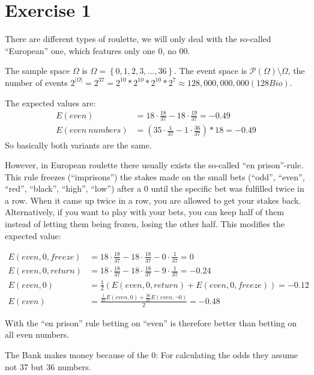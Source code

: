 \def \TutorialSheetNumber{2}


\section*{Exercise 1}
There are different types of roulette, we will only deal with the so-called 
``European'' one, which features only one $0$, no $00$.

The sample space $\Omega$ is $\Omega=\left\{0, 1, 2, 3, ..., 36\right\}$. The event space is $\mathcal{P} \left( \Omega \right) \setminus \Omega$, the number of events $2^{|\Omega|} = 2^37 = 2^10 * 2^10 * 2^10 * 2^7 \approx 128,000,000,000 (128 Bio)$.

The expected values are:
\begin{align*}
E(even) &= 18 \cdot \frac{18}{37} - 18 \cdot \frac{19}{37} = -0.49\\
E(even\ numbers) &= \left(35 \cdot \frac{1}{37} - 1 \cdot \frac{36}{37} \right) * 18 = -0.49
\end{align*}
So basically both variants are the same. 

However, in European roulette there usually exists the so-called ``en prison''-rule. This rule freezes (``imprisons'') the stakes made on the small bets (``odd'', ``even'', ``red'', ``black'', ``high'', ``low'') after a $0$ until the specific bet was fulfilled twice in a row. When it came up twice in a row, you are allowed to get your stakes back. Alternatively, if you want to play with your bets, you can keep half of them instead of letting them being frozen, losing the other half. This modifies the expected value:

\begin{align*}
E(even, 0, freeze) &= 18 \cdot \frac{18}{37} - 18 \cdot \frac{18}{37} - 0 \cdot \frac{1}{37} = 0  \\
E(even, 0, return) &= 18 \cdot \frac{18}{37} - 18 \cdot \frac{18}{37} - 9 \cdot \frac{1}{37} = -0.24  \\
E(even, 0) &= \frac{1}{2} \left( E(even, 0, return) + E(even, 0, freeze) \right) = -0.12 \\
E(even) &= \frac{\frac{1}{37} E(even, 0) + \frac{36}{37} E(even, \neg 0)}{2} = -0.48
\end{align*}

With the ``en prison'' rule betting on ``even'' is therefore better than betting on all even numbers.

\noindent {}

The Bank makes money because of the $0$: For calculating the odds they assume not 37 but 36 numbers.
\\
\\
\setcounter{equation}{0}
